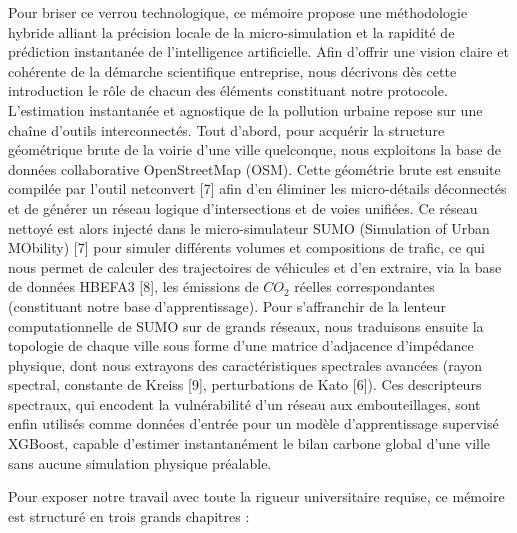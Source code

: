 \documentclass[10pt, a4paper]{article}
\begin{document}
Pour briser ce verrou technologique, ce mémoire propose une méthodologie
hybride alliant la précision locale de la micro-simulation et la
rapidité de prédiction instantanée de l'intelligence artificielle. Afin
d'offrir une vision claire et cohérente de la démarche scientifique
entreprise, nous décrivons dès cette introduction le rôle de chacun des
éléments constituant notre protocole. L'estimation instantanée et
agnostique de la pollution urbaine repose sur une chaîne d'outils
interconnectés. Tout d'abord, pour acquérir la structure géométrique
brute de la voirie d'une ville quelconque, nous exploitons la base de
données collaborative OpenStreetMap (OSM). Cette géométrie brute est
ensuite compilée par l'outil netconvert {[}7{]} afin d'en éliminer les
micro-détails déconnectés et de générer un réseau logique
d'intersections et de voies unifiées. Ce réseau nettoyé est alors
injecté dans le micro-simulateur SUMO (Simulation of Urban MObility)
{[}7{]} pour simuler différents volumes et compositions de trafic, ce
qui nous permet de calculer des trajectoires de véhicules et d'en
extraire, via la base de données HBEFA3 {[}8{]}, les émissions de
\(CO_2\) réelles correspondantes (constituant notre base
d'apprentissage). Pour s'affranchir de la lenteur computationnelle de
SUMO sur de grands réseaux, nous traduisons ensuite la topologie de
chaque ville sous forme d'une matrice d'adjacence d'impédance physique,
dont nous extrayons des caractéristiques spectrales avancées (rayon
spectral, constante de Kreiss {[}9{]}, perturbations de Kato {[}6{]}).
Ces descripteurs spectraux, qui encodent la vulnérabilité d'un réseau
aux embouteillages, sont enfin utilisés comme données d'entrée pour un
modèle d'apprentissage supervisé XGBoost, capable d'estimer
instantanément le bilan carbone global d'une ville sans aucune
simulation physique préalable.

Pour exposer notre travail avec toute la rigueur universitaire requise,
ce mémoire est structuré en trois grands chapitres :
\end{document}
